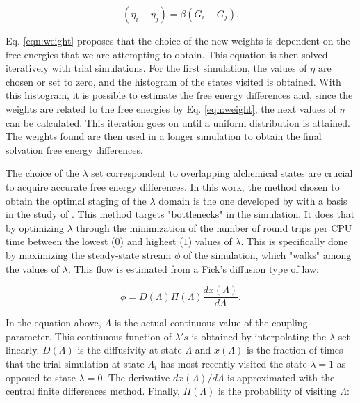     \begin{equation}
    (\eta_{i} - \eta_{j}) = \beta(G_i-G_j).
    \label{eqn:weight}
    \end{equation}
    
    Eq. \eqref{eqn:weight} proposes that the choice of the new weights is dependent on the free energies that we are attempting to obtain. This equation is then solved iteratively with trial simulations. For the first simulation, the values of $\eta$ are chosen or set to zero, and the histogram of the states visited is obtained. With this histogram, it is possible to estimate the free energy differences and, since the weights are related to the free energies by Eq. \eqref{eqn:weight}, the next values of $\eta$ can be calculated. This iteration goes on until a uniform distribution is attained. The weights found are then used in a longer simulation to obtain the final solvation free energy differences.
    
    The choice of the $\lambda$ set correspondent to overlapping alchemical states are crucial to acquire accurate free energy differences. In this work, the method chosen to obtain the optimal staging of the $\lambda$ domain is the one developed by  with a basis in the study of  . This method targets "bottlenecks" in the simulation. It does that by optimizing $\lambda$ through the minimization of the number of round trips per CPU time between the lowest ($0$) and highest ($1$) values of $\lambda$. This is specifically done by maximizing the steady-state stream $\phi$ of the simulation, which "walks" among the values of $\lambda$. This flow is estimated from a Fick's diffusion type of law:
    
    \begin{equation}
    \phi = D(\Lambda) \Pi (\Lambda) \dfrac{dx(\Lambda)}{d \Lambda}.
    \label{eqn:stream}
    \end{equation}
    
    In the equation above, $\Lambda$ is the actual continuous value of the coupling parameter. This continuous function of $\lambda 's$ is obtained by interpolating the $\lambda$ set linearly. $D(\Lambda)$ is the diffusivity at  state $\Lambda$ and $x(\Lambda)$ is the fraction of times that the trial simulation at state $\Lambda_{i}$ has most recently visited the state $\lambda=1$ as opposed to state $\lambda=0$. The derivative ${dx(\Lambda)}/{d \Lambda}$ is approximated with the central finite differences method. Finally, $\Pi (\Lambda)$ is the probability of visiting $\Lambda$:
    

